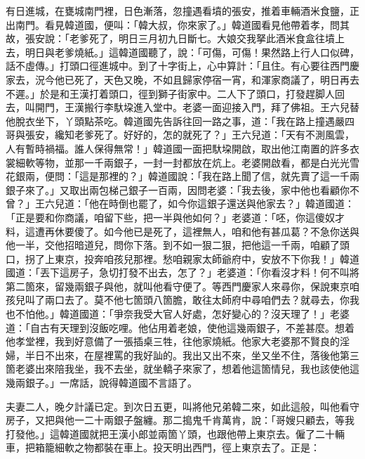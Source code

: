 有日進城，在甕城南門裡，日色漸落，忽撞遇看墳的張安，推着車輛酒米食鹽，正出南門。看見韓道國，便叫：「韓大叔，你來家了。」韓道國看見他帶着孝，問其故，張安說：「老爹死了，明日三月初九日斷七。大娘交我拏此酒米食盒往墳上去，明日與老爹燒紙。」這韓道國聽了，說：「可傷，可傷！果然路上行人口似碑，話不虛傳。」打頭口徑進城中。到了十字街上，心中算計：「且住。有心要往西門慶家去，況今他已死了，天色又晚，不如且歸家停宿一宵，和渾家商議了，明日再去不遲。」{}於是和王漢打着頭口，徑到獅子街家中。二人下了頭口，打發趕脚人回去，叫開門，王漢搬行李馱垜進入堂中。老婆一面迎接入門，拜了佛祖。王六兒替他脫衣坐下，丫頭點茶吃。韓道國先告訴往回一路之事，道：「我在路上撞遇嚴四哥與張安，纔知老爹死了。好好的，怎的就死了？」王六兒道：「天有不測風雲，人有暫時禍福。誰人保得無常！」韓道國一面把馱垜開啟，取出他江南置的許多衣裳細軟等物，並那一千兩銀子，一封一封都放在炕上。老婆開啟看，都是白光光雪花銀兩，便問：「這是那裡的？」韓道國說：「我在路上聞了信，就先賣了這一千兩銀子來了。」又取出兩包梯己銀子一百兩，因問老婆：「我去後，家中他也看顧你不曾？」王六兒道：「他在時倒也罷了，如今你這銀子還送與他家去？」韓道國道：「正是要和你商議，咱留下些，把一半與他如何？」老婆道：「呸，你這傻奴才料，這遭再休要傻了。如今他已是死了，這裡無人，咱和他有甚瓜葛？不急你送與他一半，交他招暗道兒，問你下落。到不如一狠二狠，把他這一千兩，咱顧了頭口，拐了上東京，投奔咱孩兒那裡。愁咱親家太師爺府中，安放不下你我！」{}韓道國道：「丟下這房子，急切打發不出去，怎了？」老婆道：「你看沒才料！何不叫將第二箇來，{}留幾兩銀子與他，就叫他看守便了。等西門慶家人來尋你，保說東京咱孩兒叫了兩口去了。莫不他七箇頭八箇膽，敢往太師府中尋咱們去？就尋去，你我也不怕他。」韓道國道：「爭奈我受大官人好處，怎好變心的？沒天理了！」{}老婆道：「自古有天理到沒飯吃哩。他佔用着老娘，使他這幾兩銀子，不差甚麼。{}想着他孝堂裡，我到好意備了一張插桌三牲，往他家燒紙。他家大老婆那不賢良的淫婦，半日不出來，在屋裡罵的我好訕的。{}我出又出不來，坐又坐不住，落後他第三箇老婆出來陪我坐，我不去坐，就坐轎子來家了，想着他這箇情兒，我也該使他這幾兩銀子。」一席話，說得韓道國不言語了。

夫妻二人，晚夕計議已定。到次日五更，叫將他兄弟韓二來，如此這般，叫他看守房子，又把與他一二十兩銀子盤纏。那二搗鬼千肯萬肯，說：「哥嫂只顧去，等我打發他。」這韓道國就把王漢小郎並兩箇丫頭，也跟他帶上東京去。僱了二十輛車，把箱籠細軟之物都裝在車上。投天明出西門，徑上東京去了。正是：


